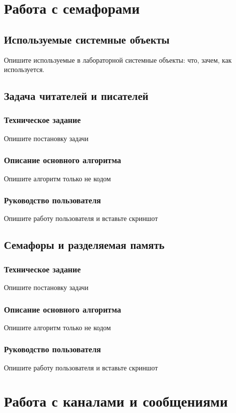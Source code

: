 \documentclass[a4paper,14pt]{extarticle}
\begin{document}
\section{Работа с семафорами}
\subsection{Используемые системные объекты}
Опишите используемые в лабораторной системные объекты: что, зачем, как используется.

\subsection{Задача читателей и писателей}
\subsubsection{Техническое задание}
Опишите постановку задачи

\subsubsection{Описание основного алгоритма}
Опишите алгоритм только не кодом

\subsubsection{Руководство пользователя}
Опишите работу пользователя и вставьте скриншот

\subsection{Семафоры и разделяемая память}
\subsubsection{Техническое задание}
Опишите постановку задачи

\subsubsection{Описание основного алгоритма}
Опишите алгоритм только не кодом

\subsubsection{Руководство пользователя}
Опишите работу пользователя и вставьте скриншот
\newpage

\section{Работа с каналами и сообщениями}
\end{document}

